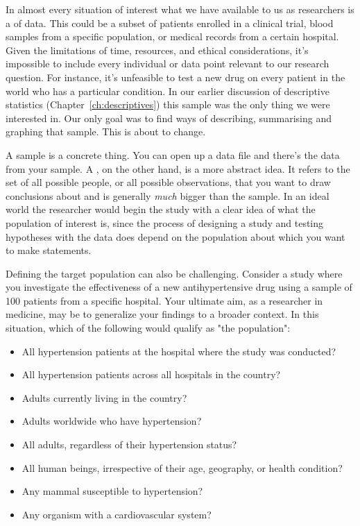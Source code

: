 In almost every situation of interest what we have available to us as researchers is a  of data. This could be a subset of patients enrolled in a clinical trial, blood samples from a specific population, or medical records from a certain hospital. Given the limitations of time, resources, and ethical considerations, it's impossible to include every individual or data point relevant to our research question. For instance, it's unfeasible to test a new drug on every patient in the world who has a particular condition. In our earlier discussion of descriptive statistics (Chapter~\ref{ch:descriptives}) this sample was the only thing we were interested in. Our only goal was to find ways of describing, summarising and graphing that sample. This is about to change.


A sample is a concrete thing. You can open up a data file and there's the data from your sample. A , on the other hand, is a more abstract idea. It refers to the set of all possible people, or all possible observations, that you want to draw conclusions about and is generally {\it much} bigger than the sample. In an ideal world the researcher would begin the study with a clear idea of what the population of interest is, since the process of designing a study and testing hypotheses with the data does depend on the population about which you want to make statements. 

Defining the target population can also be challenging. Consider a study where you investigate the effectiveness of a new antihypertensive drug using a sample of 100 patients from a specific hospital. Your ultimate aim, as a researcher in medicine, may be to generalize your findings to a broader context. In this situation, which of the following would qualify as "the population":
\begin{itemize} \itemsep -2pt
\item All hypertension patients at the hospital where the study was conducted?
\item All hypertension patients across all hospitals in the country?
\item Adults currently living in the country?
\item Adults worldwide who have hypertension?
\item All adults, regardless of their hypertension status?
\item All human beings, irrespective of their age, geography, or health condition?
\item Any mammal susceptible to hypertension?
\item Any organism with a cardiovascular system?
\end{itemize}

